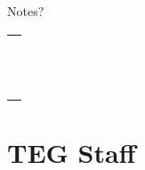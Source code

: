 \documentclass[9pt,twoside,openright,final,article,letterpaper]{memoir}
\let\oldsection=\section
\renewcommand{\section}[1]{%
  \nopagebreak
  \vspace{6pt} %
  \needspace{1.5in}
  \oldsection{#1}
  \nopagebreak}
\begin{document}
\vfill

{\hminfamily\Large Notes?}

\begin{tabular}{l}
\hspace{6.5in} \\
\hline \\
\hline \\
\hline \\
\hline \\
\hline \\
\hline \\
\hline \\
\hline \\
\hline \\
\hline \\
\hline \\
\hline \\
\end{tabular}

\pagestyle{headings}
\newpage

\section{TEG Staff}
\end{document}
